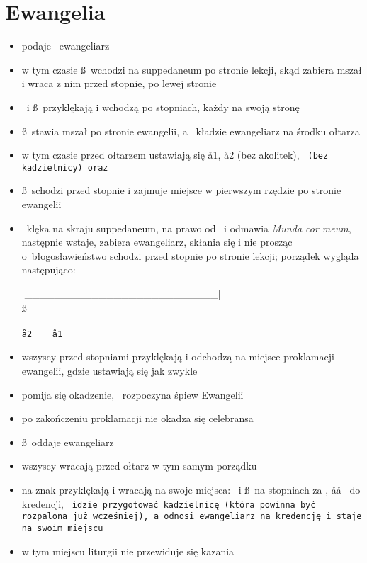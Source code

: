 \section{Ewangelia}

\begin{itemize}
	\item {} podaje \dd~ewangeliarz
	\item w tym czasie \ss~wchodzi na suppedaneum po stronie lekcji, skąd
		zabiera mszał i wraca z nim przed stopnie, po lewej stronie \dd
	\item \dd~i \ss~przyklękają i wchodzą po stopniach, każdy na swoją stronę
	\item \ss~stawia mszał po stronie ewangelii, a \dd~kładzie ewangeliarz na
		środku ołtarza
	\item w tym czasie przed ołtarzem ustawiają się \aa1, \aa2 (bez akolitek),
		\tt~(bez kadzielnicy) oraz 
	\item \ss~schodzi przed stopnie i zajmuje miejsce w pierwszym rzędzie po
		stronie ewangelii
	\item \dd~klęka na skraju suppedaneum, na prawo od \ii~i odmawia
		\textit{Munda cor meum}, następnie wstaje, zabiera ewangeliarz,
		skłania się i nie prosząc o błogosławieństwo schodzi przed
		stopnie po stronie lekcji; porządek wygląda następująco:
		\begin{center}
			|\_\_\_\_\_\_\_\_\_\_\_\_\_\_\_\_\_\_\_\_\_\_\_\_\_\_|\\
			\ss~~~~\dd\\
			~~~~\tt\\
			\aa2~~~~\aa1
		\end{center}
	\item wszyscy przed stopniami przyklękają i odchodzą na miejsce proklamacji
		ewangelii, gdzie ustawiają się jak zwykle
	\item pomija się okadzenie, \dd~rozpoczyna śpiew Ewangelii
	\item po zakończeniu proklamacji nie okadza się celebransa
	\item \ss~oddaje ewangeliarz 
	\item wszyscy wracają przed ołtarz w tym samym porządku
	\item na znak  przyklękają i wracają na swoje miejsca: \dd~i \ss~na stopniach
		za \ii, \aa\aa~ do kredencji, \tt~idzie przygotować kadzielnicę (która
		powinna być rozpalona już wcześniej), a  odnosi ewangeliarz na
		kredencję i staje na swoim miejscu
	\item w tym miejscu liturgii nie przewiduje się kazania
\end{itemize}

